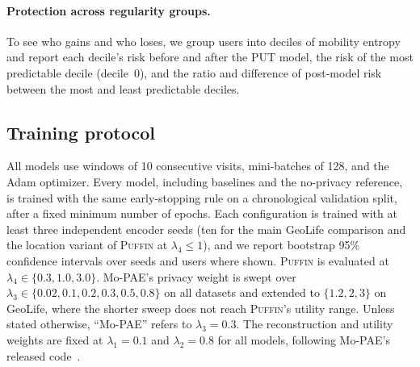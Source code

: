 \documentclass[sigconf,anonymous,review]{acmart}
\newcommand{\puffin}{\textsc{Puffin}}
\begin{document}
\paragraph{Protection across regularity groups.} To see who gains and who loses, we group users into deciles of mobility entropy and report each decile's risk before and after the PUT model, the risk of the most predictable decile (decile~0), and the ratio and difference of post-model risk between the most and least predictable deciles.

\subsection{Training protocol}
All models use windows of 10 consecutive visits, mini-batches of 128, and the Adam optimizer. Every model, including baselines and the no-privacy reference, is trained with the same early-stopping rule on a chronological validation split, after a fixed minimum number of epochs. Each configuration is trained with at least three independent encoder seeds (ten for the main GeoLife comparison and the location variant of \puffin{} at $\lambda_4\le1$), and we report bootstrap 95\% confidence intervals over seeds and users where shown. \puffin{} is evaluated at $\lambda_4\in\{0.3,1.0,3.0\}$. Mo-PAE's privacy weight is swept over $\lambda_3\in\{0.02, 0.1, 0.2, 0.3, 0.5, 0.8\}$ on all datasets and extended to $\{1.2,2,3\}$ on GeoLife, where the shorter sweep does not reach \puffin's utility range. Unless stated otherwise, ``Mo-PAE'' refers to $\lambda_3=0.3$. The reconstruction and utility weights are fixed at $\lambda_1=0.1$ and $\lambda_2=0.8$ for all models, following Mo-PAE's released code~\cite{zhan2023mopae}.
\end{document}
